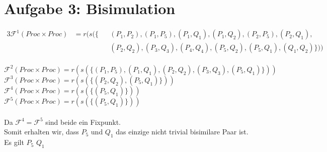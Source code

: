 \section*{Aufgabe 3: Bisimulation}

\begin{alignat*}{3}
\mathcal{F}^{1}(Proc \times Proc) &= r(s(\{&&(P_1, P_2),(P_1, P_5),(P_1, Q_1), (P_1, Q_2),(P_2, P_5),(P_2, Q_1),\\
								  &		  &&(P_2, Q_2),(P_3, Q_3),(P_4, Q_4),(P_5, Q_2),(P_5, Q_1),(Q_1, Q_2)\}))
\end{alignat*}
\\
$\mathcal{F}^{2}(Proc \times Proc) = r(s(\{(P_1, P_5),(P_1, Q_1),(P_2, Q_2),(P_3, Q_3),(P_5, Q_1)\}))$
\\
$\mathcal{F}^{3}(Proc \times Proc) = r(s(\{(P_2, Q_2),(P_5, Q_1)\}))$
\\
$\mathcal{F}^{4}(Proc \times Proc) = r(s(\{(P_5, Q_1)\}))$
\\
$\mathcal{F}^{5}(Proc \times Proc) = r(s(\{(P_5, Q_1)\}))$
\\\\
Da $\mathcal{F}^{4} = \mathcal{F}^{5}$ sind beide ein Fixpunkt.
\\
Somit erhalten wir, dass $P_5$ und $Q_1$ das einzige nicht trivial bisimilare Paar ist. Es gilt $P_5$ \bisim $Q_1$

